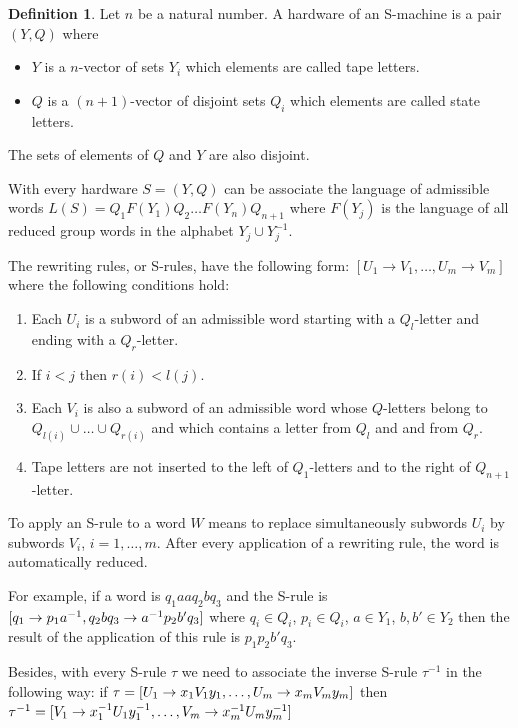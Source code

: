 \documentclass[conference]{IEEEtran}
\theoremstyle{definition}
\newtheorem{defn}{Definition}[section]
\begin{document}
\begin{defn}
Let $n$ be a natural number.
A hardware of an S-machine is a pair $(Y, Q)$ where
\begin{itemize}
    \item $Y$ is a $n$-vector of sets $Y_i$ which elements are called tape letters.
    \item $Q$ is a $(n + 1)$-vector of disjoint sets $Q_i$ which elements are called state letters.
\end{itemize}
The sets of elements of $Q$ and $Y$ are also disjoint.
\end{defn}

With every hardware $S = (Y, Q)$ can be associate the language of admissible words
$L(S) = Q_1F(Y_1)Q_2 \dots F(Y_n)Q_{n+1}$ where $F(Y_j)$ is the language
of all reduced group words in the alphabet $Y_j \cup Y_j^{-1}$.

The rewriting rules, or S-rules, have the following form:
$[U_1 \to V_1, \dots ,  U_m \to V_m]$
where the following conditions hold:
\begin{enumerate}
    \item Each $U_i$ is a subword of an admissible word starting with a $Q_l$-letter and ending with a $Q_r$-letter.
    \item If $i < j$ then $r(i) < l(j)$.
    \item Each $V_i$ is also a subword of an admissible word whose $Q$-letters belong to $Q_{l(i)} \cup \dots \cup Q_{r(i)}$ and which contains a letter from $Q_l$ and and from $Q_r$.
    \item Tape letters are not inserted to the left of $Q_1$-letters and to the right of $Q_{n+1}$-letter.
\end{enumerate}

To apply an S-rule to a word $W$ means to replace simultaneously
subwords $U_i$ by subwords $V_i$, $i = 1, \dots, m$. After every application of
a rewriting rule, the word is automatically reduced.

For example, if a word is
$q_1 a a q_2 b q_3$
and the S-rule is
$\newline
[q_1 \to p_1 a^{-1}, q_2 b q_3 \to a^{-1} p_2 b' q_3] $
where $q_i \in Q_i$, $p_i \in Q_i$, $a \in Y_1$, $b, b' \in Y_2$ then the result
of the application of this rule is
$p_1 p_2 b' q_3$.

Besides, with every S-rule $\tau$ we need to associate the inverse S-rule $\tau^{-1}$ in the following way: if
$\\ \tau = [U_1 \to x_1 V_1 y_1, \dots, U_m \to x_m V_m y_m]$
then
$\\ \tau^{-1} = [V_1 \to x_1^{-1} U_1 y_1^{-1}, \dots, V_m \to x_m^{-1} U_m y_m^{-1}]$
\end{document}
